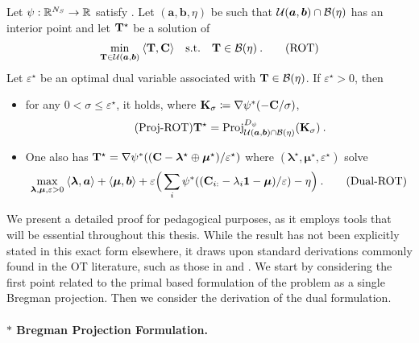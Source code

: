 \begin{proposition}\label{prop:cot}
    Let $\psi : \mathbb{R}^{N_S} \to \mathbb{R}$ satisfy . Let $(\bm{a}, \bm{b}, \eta)$ be such that ${\mathcal{U}}(\bm{a}, \bm{b}) \cap \mathcal{B}(\eta)$ has an interior point and let ${\mathbf{T}}^\star$ be a solution of
\begin{align}
    \min_{{\mathbf{T}} \in {\mathcal{U}}(\bm{a}, \bm{b})} \: \langle {\mathbf{T}}, {\mathbf{C}} \rangle \quad \text{s.t.} \quad  {\mathbf{T}} \in \mathcal{B}(\eta) \:.
    \tag{ROT}
\end{align}
    Let $\varepsilon^\star$ be an optimal dual variable associated with ${\mathbf{T}} \in \mathcal{B}(\eta)$.
    If $\varepsilon^\star > 0$, then
    \begin{itemize}[leftmargin=*, labelsep=0.1em]
        \item for any $0 < \sigma \leq \varepsilon^\star$, it holds, where ${\mathbf{K}}_\sigma \coloneqq \nabla \psi^*(-{\mathbf{C}}/ \sigma)$, 
        \begin{align}\label{eq:proj-rot}\tag{Proj-ROT}
            {\mathbf{T}}^\star = \operatorname{Proj}^{D_\psi}_{{\mathcal{U}}(\bm{a}, \bm{b}) \cap \mathcal{B}(\eta)}({\mathbf{K}}_\sigma) \:.
        \end{align}
        \item One also has ${\mathbf{T}}^\star = \nabla \psi^*(({\mathbf{C}} - \bm{\lambda}^\star \oplus \bm{\mu}^\star) / \varepsilon^\star)$
        where $(\bm{\lambda}^\star, \bm{\mu}^\star, \varepsilon^\star)$ solve
        \begin{align}\label{eq:dual-rot}
            \max_{\bm{\lambda}, \bm{\mu}, \varepsilon>0}  \: \langle \bm{\lambda}, \bm{a} \rangle + \langle \bm{\mu}, \bm{b} \rangle + \varepsilon \Big(\sum_i \psi^*((\mathbf{C}_{i:} - \lambda_i \bm{1} - \bm{\mu}) / \varepsilon) - \eta \Big) \:.
        \tag{Dual-ROT}
        \end{align}
    \end{itemize}
\end{proposition}

We present a detailed proof for pedagogical purposes, as it employs tools that will be essential throughout this thesis. While the result has not been explicitly stated in this exact form elsewhere, it draws upon standard derivations commonly found in the OT literature, such as those in \citep{peyre2019computational} and \citep{blondel2018smooth}. We start by considering the first point related to the primal based formulation of the problem as a single Bregman projection. Then we consider the derivation of the dual formulation.

\paragraph{$\ast$ Bregman Projection Formulation.}

